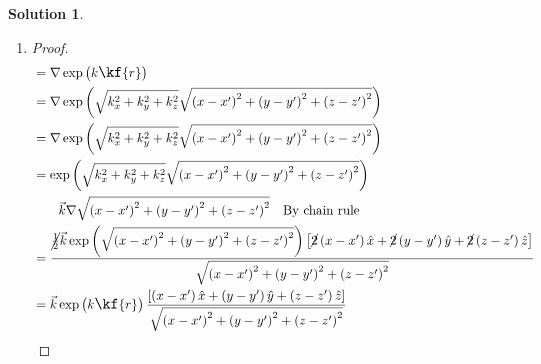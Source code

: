 \documentclass[10pt]{article}
\theoremstyle{definition}
\newtheorem{soln}{Solution}
\newcommand{\ux}{\hat{x}}
\newcommand{\uy}{\hat{y}}
\newcommand{\uz}{\hat{z}}
\newcommand{\primed}[1]{#1^\prime}
\newcommand{\scriptr}{\fontsize{12pt}{12pt}\kf{r}}
\newcommand{\bscriptr}{\fontsize{12pt}{12pt}\kfb{r}}
\begin{document}
\begin{soln}
\begin{enumerate}[label=(\alph*)]
\begin{proof}
\begin{align*}
               & \qquad + k_y\exp\left(k_x(x-\primed{x})+k_y(y-\primed{y})+k_z(z-\primed{z})\right)  \uy \\
               & \qquad + k_z\exp\left(k_x(x-\primed{x})+k_y(y-\primed{y})+k_z(z-\primed{z})\right)  \uz \\
               & = (k_x, k_y, k_z)\exp\left(k_x(x-\primed{x})+k_y(y-\primed{y})+k_z(z-\primed{z})\right) \\
               & = \vec{k}\exp\left(\vec{k}\cdot\vec{\bscriptr}\right)\qedhere
            \end{align*}
          \end{proof}
    \item \begin{proof}
            \begin{align*}
               & = \nabla\exp\left(k\scriptr\right)                                                                                                                 \\
               & = \nabla\exp\left(\sqrt{k_x^2 + k_y^2 + k_z^2}\sqrt{\left(x-\primed{x}\right)^2 + \left(y-\primed{y}\right)^2+ \left(z-\primed{z}\right)^2}\right) \\
               & = \nabla\exp\left(\sqrt{k_x^2 + k_y^2 + k_z^2}\sqrt{\left(x-\primed{x}\right)^2 + \left(y-\primed{y}\right)^2+ \left(z-\primed{z}\right)^2}\right) \\
               & = \exp\left(\sqrt{k_x^2 + k_y^2 + k_z^2}\sqrt{\left(x-\primed{x}\right)^2 + \left(y-\primed{y}\right)^2+ \left(z-\primed{z}\right)^2}\right)       \\
               & \qquad\vec{k}\nabla\sqrt{\left(x-\primed{x}\right)^2 + \left(y-\primed{y}\right)^2+ \left(z-\primed{z}\right)^2} \quad \text{By chain rule}        \\
               & = \frac{\cancel{\frac{1}{2}}\vec{k}\exp\left(\sqrt{\left(x-\primed{x}\right)^2 + \left(y-\primed{y}\right)^2+ \left(z-\primed{z}\right)^2}\right)
                \left[\cancel{2}\left(x-\primed{x}\right)\ux + \cancel{2}\left(y-\primed{y}\right)\uy+ \cancel{2}\left(z-\primed{z}\right)\uz\right]
              }{\sqrt{\left(x-\primed{x}\right)^2 + \left(y-\primed{y}\right)^2+ \left(z-\primed{z}\right)^2}}                                                      \\
               & = \vec{k}\exp\left(k\scriptr\right)\frac{\left[\left(x-\primed{x}\right)\ux + \left(y-\primed{y}\right)\uy+ \left(z-\primed{z}\right)\uz\right]
              }{\sqrt{\left(x-\primed{x}\right)^2 + \left(y-\primed{y}\right)^2+ \left(z-\primed{z}\right)^2}}                                                      \\

\end{align*}
\end{proof}
\end{enumerate}
\end{soln}
\end{document}
